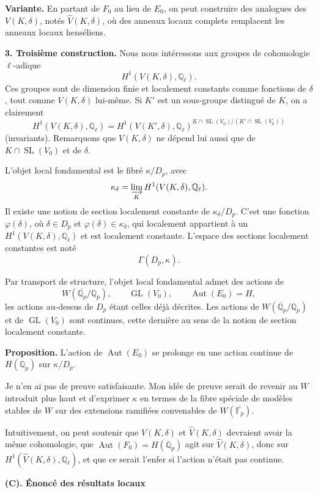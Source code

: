 \documentclass[11pt]{article}
\newcommand{\Fp}{\mathbb{F}_{p}}
\newcommand{\Qp}{\mathbb{Q}_{p}}
\newcommand{\Ql}{\mathbb{Q}_{\ell}}
\newcommand{\Aut}{\operatorname{Aut}}
\newcommand{\GL}{\operatorname{GL}}
\newcommand{\SL}{\operatorname{SL}}
\newcommand{\Lim}{\varinjlim}
\newcommand{\wh}{\widehat}
\begin{document}
\textbf{Variante.} En partant de \(F_0\) au lieu de \(E_0\), on peut construire des analogues des \(V(K,\delta)\), notés \(\wh V(K,\delta)\), où des anneaux locaux complets remplacent les anneaux locaux henséliens.

\textbf{3. Troisième construction.} Nous nous intéressons aux groupes de cohomologie \(\ell\)-adique
\[
H^1(V(K,\delta),\Ql).
\]
Ces groupes sont de dimension finie et localement constants comme fonctions de \(\delta\), tout comme \(V(K,\delta)\) lui-même. Si \(K'\) est un sous-groupe distingué de \(K\), on a clairement
\[
H^1(V(K,\delta),\Ql)=
H^1(V(K',\delta),\Ql)^{K\cap\SL(V_0)/(K'\cap\SL(V_0))}
\]
(invariants). Remarquons que \(V(K,\delta)\) ne dépend lui aussi que de \(K\cap\SL(V_0)\) et de \(\delta\).

L'objet local fondamental est le fibré \(\kappa/D_p\), avec
\[
\kappa_{\delta}=\Lim_K H^1(V(K,\delta),\Ql).
\]
Il existe une notion de section localement constante de \(\kappa_\delta/D_p\). C'est une fonction \(\varphi(\delta)\), où \(\delta\in D_p\) et \(\varphi(\delta)\in\kappa_\delta\), qui localement appartient à un \(H^1(V(K,\delta),\Ql)\) et est localement constante. L'espace des sections localement constantes est noté
\[
\Gamma(D_p,\kappa).
\]

Par transport de structure, l'objet local fondamental admet des actions de
\[
W(\overline{\Qp}/\Qp),\qquad \GL(V_0),\qquad \Aut(E_0)=H,
\]
les actions au-dessus de \(D_p\) étant celles déjà décrites. Les actions de \(W(\overline{\Qp}/\Qp)\) et de \(\GL(V_0)\) sont continues, cette dernière au sens de la notion de section localement constante.

\textbf{Proposition.} L'action de \(\Aut(E_0)\) se prolonge en une action continue de \(H(\Qp)\) sur \(\kappa/D_p\).

Je n'en ai pas de preuve satisfaisante. Mon idée de preuve serait de revenir au \(W\) introduit plus haut et d'exprimer \(\kappa\) en termes de la fibre spéciale de modèles stables de \(W\) sur des extensions ramifiées convenables de \(W(\overline{\Fp})\).

Intuitivement, on peut soutenir que \(V(K,\delta)\) et \(\wh V(K,\delta)\) devraient avoir la même cohomologie, que \(\Aut(F_0)=H(\Qp)\) agit sur \(\wh V(K,\delta)\), donc sur \(H^1(\wh V(K,\delta),\Ql)\), et que ce serait l'enfer si l'action n'était pas continue.

\begin{center}
\textbf{(C). Énoncé des résultats locaux}
\end{center}
\end{document}
